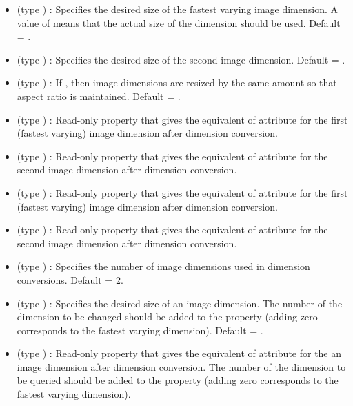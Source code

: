 \documentclass{article}
\begin{document}
\begin{itemize}
\item {} (type ) : Specifies the
desired size of the fastest varying image dimension. A value of
 means that the actual size of the dimension
should be used. Default = .

\item {} (type ) : Specifies the
desired size of the second image dimension. Default =
. 

\item {} (type ) : If ,
then image dimensions are resized by the same amount so that aspect
ratio is maintained. Default = .

\item {} (type ) : Read-only
property that gives the equivalent of attribute  for the
first (fastest varying) image dimension after dimension conversion.

\item {} (type ) : Read-only
property that gives the equivalent of attribute  for the
second image dimension after dimension conversion.

\item {} (type ) : Read-only
property that gives the equivalent of attribute  for the
first (fastest varying) image dimension after dimension conversion.

\item {} (type ) : Read-only
property that gives the equivalent of attribute  for the
second image dimension after dimension conversion.

\item {} (type ) : Specifies the
number of image dimensions used in dimension conversions. Default = 2.

\item {} (type ) : Specifies the
desired size of an image dimension. The number of the dimension to be
changed should be added to the property (adding zero corresponds to
the fastest varying dimension). Default = . 

\item {} (type ) : Read-only
property that gives the equivalent of attribute  for the
an image dimension after dimension conversion. The number of the
dimension to be queried should be added to the property (adding zero
corresponds to the fastest varying dimension). 


\end{itemize}
\end{document}
